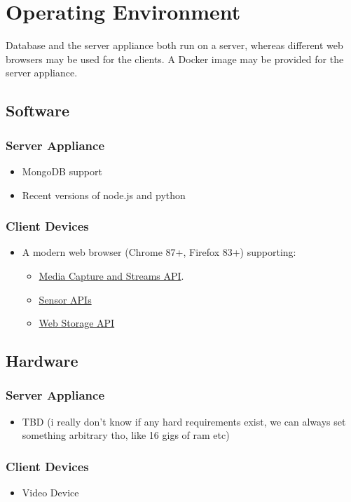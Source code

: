 \section{Operating Environment}
Database and the server appliance both run on a server, whereas different web browsers may be used for the clients. A Docker image may be provided for the server appliance.

\subsection{Software}
\subsubsection{Server Appliance}
\begin{itemize}
    \item MongoDB support
    \item Recent versions of node.js and python %
\end{itemize}
\subsubsection{Client Devices}
\begin{itemize}
    \item A modern web browser (Chrome 87+, Firefox 83+) supporting:
    \begin{itemize}
        \item \href{https://developer.mozilla.org/en-US/docs/Web/API/Media_Streams_API}{Media Capture and Streams API}. %
        \item \href{https://developer.mozilla.org/en-US/docs/Web/API/Sensor_APIs}{Sensor APIs}
        \item \href{https://developer.mozilla.org/en-US/docs/Web/API/Web_Storage_API}{Web Storage API}
    \end{itemize}
\end{itemize}

\subsection{Hardware}
\subsubsection{Server Appliance}
\begin{itemize}
    \item TBD (i really don't know if any hard requirements exist, we can always set something arbitrary tho, like 16 gigs of ram etc)
\end{itemize}
\subsubsection{Client Devices}
\begin{itemize}
    \item Video Device
\end{itemize}
